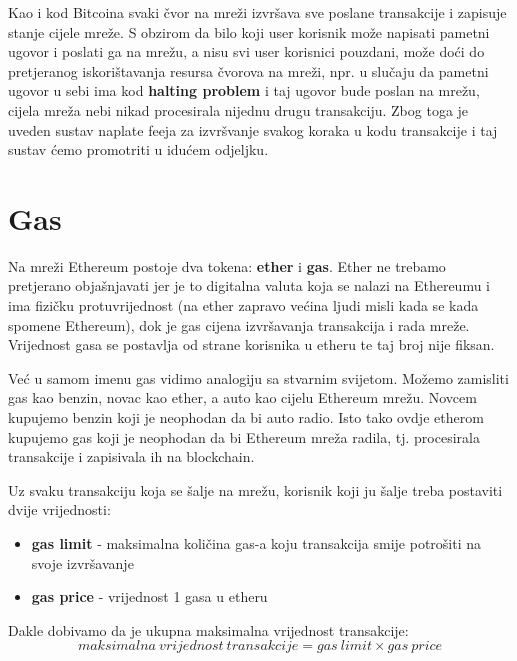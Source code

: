 \documentclass[a4paper,oneside,12pt]{memoir} %
\begin{document}
Kao i kod Bitcoina svaki čvor na mreži izvršava sve poslane transakcije i zapisuje stanje cijele mreže. S obzirom da bilo koji user korisnik može napisati pametni ugovor i poslati ga na mrežu, a nisu svi user korisnici pouzdani, može doći do pretjeranog iskorištavanja resursa čvorova na mreži, npr. u slučaju da pametni ugovor u sebi ima kod \textbf{halting problem} i taj ugovor bude poslan na mrežu, cijela mreža nebi nikad procesirala nijednu drugu transakciju. Zbog toga je uveden sustav naplate feeja za izvršvanje svakog koraka u kodu transakcije i taj sustav ćemo promotriti u idućem odjeljku.

\section{Gas}

Na mreži Ethereum postoje dva tokena: \textbf{ether} i \textbf{gas}. Ether ne trebamo pretjerano objašnjavati jer je to digitalna valuta koja se nalazi na Ethereumu i ima fizičku protuvrijednost (na ether zapravo većina ljudi misli kada se kada spomene Ethereum), dok je gas cijena izvršavanja transakcija i rada mreže. Vrijednost gasa se postavlja od strane korisnika u etheru te taj broj nije fiksan.

\begin{tcolorbox}
Već u samom imenu gas vidimo analogiju sa stvarnim svijetom. Možemo zamisliti gas kao benzin, novac kao ether, a auto kao cijelu Ethereum mrežu. Novcem kupujemo benzin koji je neophodan da bi auto radio. Isto tako ovdje etherom kupujemo gas koji je neophodan da bi Ethereum mreža radila, tj. procesirala transakcije i zapisivala ih na blockchain.
\end{tcolorbox}

Uz svaku transakciju koja se šalje na mrežu, korisnik koji ju šalje treba postaviti dvije vrijednosti:

\begin{itemize}
    \item \textbf{gas limit} - maksimalna količina gas-a koju transakcija smije potrošiti na svoje izvršavanje
    \item \textbf{gas price} - vrijednost 1 gasa u etheru
\end{itemize}

Dakle dobivamo da je ukupna maksimalna vrijednost transakcije:
\begin{equation}
    maksimalna\ vrijednost\ transakcije = gas\ limit \times gas\ price
\end{equation}
\end{document}
